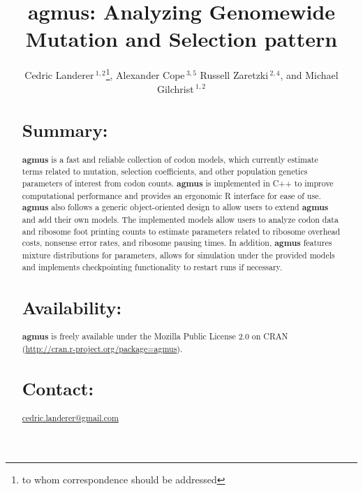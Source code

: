 \documentclass{bioinfo}
\newcommand{\pkg}[1]{{\fontseries{b}\selectfont #1}}
\newcommand{\package}{\textbf{agmus }} %
\begin{document}

\title[agmus]{agmus: Analyzing Genomewide Mutation and Selection pattern}
\author[
Landerer \textit{et~al}]{Cedric Landerer\,$^{1,2}$\footnote{
to whom correspondence should be addressed
},
Alexander Cope\,$^{3,5}$
Russell Zaretzki\,$^{2,4}$, and
Michael Gilchrist\,$^{1,2}$
}
\address{$^{1}$
Department of Ecology and Evolutionary Biology,
$^{2}$National Institute for Mathematical and Biological Synthesis,
$^{3}$Genome Science and Technology
$^{4}$Department of Statistics, Operations, and Management Science,
University of Tennessee, Knoxville, TN, USA,
$^{5}$Oak Ridge National Labratory, Oak Ridge, TN, USA} 


\maketitle

\begin{abstract}

\section{Summary:}
\pkg{\package} is a fast and reliable collection of codon models, which currently estimate terms related to mutation, selection coefficients, and other population genetics parameters of interest from codon counts.
\package is implemented in C++ to improve computational performance and provides an ergonomic R interface for ease of use. 
\package also follows a generic object-oriented design to allow users to extend \package and add their own models.
The implemented models allow users to analyze codon data and ribosome foot printing counts to estimate parameters related to ribosome overhead costs, nonsense error rates, and ribosome pausing times. 
In addition, \package features mixture distributions for parameters, allows for simulation under the provided models and implements checkpointing functionality to restart runs if necessary. 

\section{Availability:}
\pkg{\package} is freely available under the Mozilla Public License 2.0
on CRAN (\url{http://cran.r-project.org/package=agmus}).

\section{Contact:} \href{cedric.landerer@gmail.com}{cedric.landerer@gmail.com}
\end{abstract}
\end{document}

